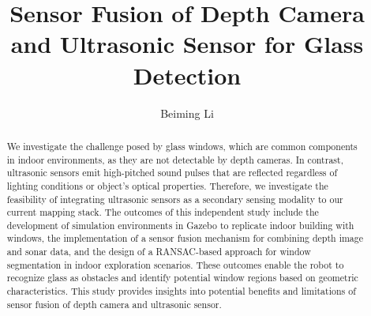 \documentclass[10pt, conference]{format/ieeeconf}
\begin{document}
\title{Sensor Fusion of Depth Camera and Ultrasonic Sensor for Glass Detection}

\author{Beiming Li}
\maketitle

\begin{abstract}
We investigate the challenge posed by glass windows, which are common components in indoor environments, as they are not detectable by depth cameras. In contrast, ultrasonic sensors emit high-pitched sound pulses that are reflected regardless of lighting conditions or object's optical properties. Therefore, we investigate the feasibility of integrating ultrasonic sensors as a secondary sensing modality to our current mapping stack. The outcomes of this independent study include the development of simulation environments in Gazebo to replicate indoor building with windows, the implementation of a sensor fusion mechanism for combining depth image and sonar data, and the design of a RANSAC-based approach for window segmentation in indoor exploration scenarios. These outcomes enable the robot to recognize glass as obstacles and identify potential window regions based on geometric characteristics. This study provides insights into potential benefits and limitations of sensor fusion of depth camera and ultrasonic sensor.

\end{abstract}
    
    
    
    
    
    
    

    

\end{document}
